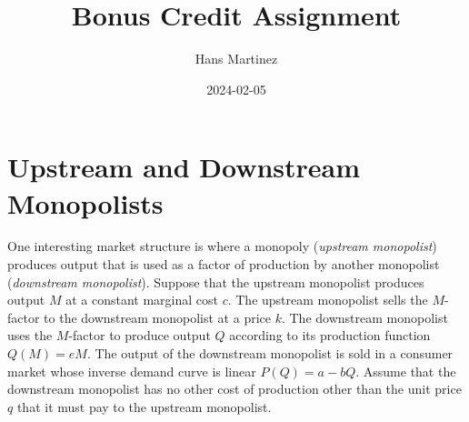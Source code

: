 \documentclass[
]{article}
\title{Bonus Credit Assignment}
\author{Hans Martinez}
\date{2024-02-05}
\begin{document}
\maketitle

\section*{Upstream and Downstream
Monopolists}\label{upstream-and-downstream-monopolists}

One interesting market structure is where a monopoly (\emph{upstream
monopolist}) produces output that is used as a factor of production by
another monopolist (\emph{downstream monopolist}). Suppose that the
upstream monopolist produces output \(M\) at a constant marginal cost
\(c\). The upstream monopolist sells the \(M\)-factor to the downstream
monopolist at a price \(k\). The downstream monopolist uses the
\(M\)-factor to produce output \(Q\) according to its production
function \(Q(M)=eM\). The output of the downstream monopolist is sold in
a consumer market whose inverse demand curve is linear \(P(Q)=a-bQ\).
Assume that the downstream monopolist has no other cost of production
other than the unit price \(q\) that it must pay to the upstream
monopolist.
\end{document}
